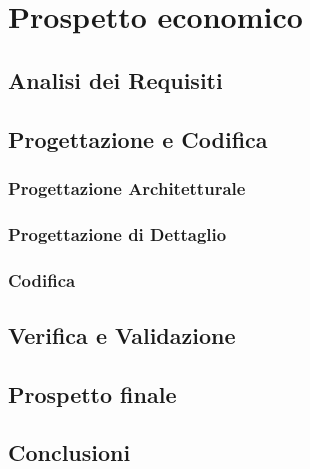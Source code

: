 \section{Prospetto economico}
\subsection{Analisi dei Requisiti}
\subsection{Progettazione e Codifica}
\subsubsection{Progettazione Architetturale}
\subsubsection{Progettazione di Dettaglio}
\subsubsection{Codifica}
\subsection{Verifica e Validazione}
\subsection{Prospetto finale}
\subsection{Conclusioni}